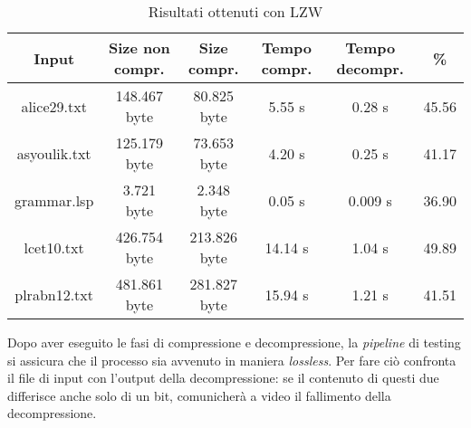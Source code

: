     \begin{table}
    \begin{tabular}{||c c c c c c||}
     \hline
     Input & Size non compr. & Size compr. & Tempo compr. & Tempo decompr. & \% \\ [0.5ex] 
     \hline\hline
     alice29.txt & 148.467 byte & 80.825 byte & 5.55 s & 0.28 s & 45.56\\ 
     \hline
     asyoulik.txt & 125.179 byte & 73.653 byte & 4.20 s & 0.25 s & 41.17\\
     \hline
     grammar.lsp & 3.721 byte & 2.348 byte & 0.05 s & 0.009 s & 36.90\\
     \hline
     lcet10.txt & 426.754 byte & 213.826 byte & 14.14 s & 1.04 s & 49.89\\
     \hline
     plrabn12.txt & 481.861 byte & 281.827 byte & 15.94 s & 1.21 s & 41.51\\ [1ex] 
     \hline
    \end{tabular} 
    \caption{Risultati ottenuti con LZW\label{tab:lzw}}
    \end{table}
Dopo aver eseguito le fasi di compressione e decompressione, la \emph{pipeline} di testing si assicura che il processo sia avvenuto in maniera \emph{lossless}. Per fare ciò confronta il file di input con l'output della decompressione: se il contenuto di questi due differisce anche solo di un bit, comunicherà a video il fallimento della decompressione.